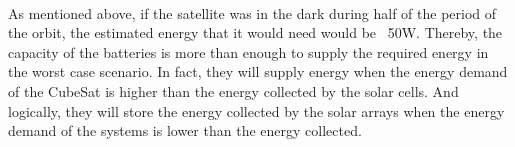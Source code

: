 \paragraph{}As mentioned above, if the satellite was in the dark during half of the period of the orbit, the estimated energy that it would need would be ~50W. Thereby, the capacity of the batteries is more than enough to supply the required energy in the worst case scenario. In fact, they will supply energy when the energy demand of the CubeSat is higher than the energy collected by the solar cells. And logically, they will store the energy collected by the solar arrays when the energy demand of the systems is lower than the energy collected.